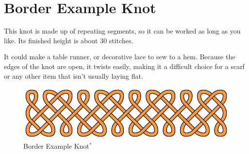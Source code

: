 \documentclass[openany]{book}
\newcommand{\gen}{\hyperref[generated]{$^*$}}%
\newcommand{\BK}{Border Example Knot}
\begin{document}
\section{\BK}
This knot is made up of repeating segments, so it can be worked as long as you like. Its finished height is about 30 stitches.

It could make a table runner, or decorative lace to sew to a hem. Because the edges of the knot are open, it twists easily, making it a difficult choice for a scarf or any other item that isn't usually laying flat.



\begin{figure}[H]\centering
\includegraphics[width=\linewidth]{border2}
\caption[\BK]{\BK\gen}\label{fig:gen3}
\end{figure}


\end{document}
